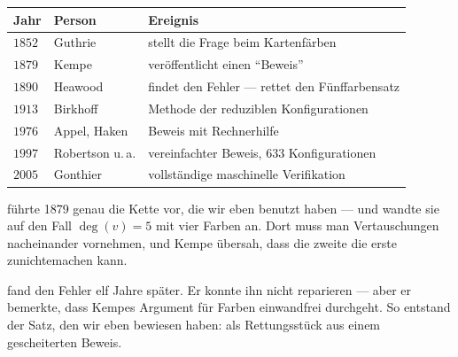 \begin{geschichte}
\begin{center}
{\small
\renewcommand{\arraystretch}{1.42}
\begin{tabular}{@{}P{1.6cm}P{2.2cm}P{4.0cm}@{}}
\toprule
\textbf{Jahr} & \textbf{Person} & \textbf{Ereignis}\\
\midrule
$1852$ & Guthrie & stellt die Frage beim Kartenfärben\\
$1879$ & Kempe & veröffentlicht einen \enquote{Beweis}\\
$1890$ & Heawood & findet den Fehler --- rettet den Fünffarbensatz\\
$1913$ & Birkhoff & Methode der reduziblen Konfigurationen\\
$1976$ & Appel, Haken & Beweis mit Rechnerhilfe\\
$1997$ & Robertson u.\,a. & vereinfachter Beweis, $633$ Konfigurationen\\
$2005$ & Gonthier & vollständige maschinelle Verifikation\\
\bottomrule
\end{tabular}}
\end{center}

 führte 1879 genau die Kette vor, die wir eben benutzt haben --- und wandte sie auf den Fall $\deg(v) = 5$ mit vier Farben an. Dort muss man  Vertauschungen nacheinander vornehmen, und Kempe übersah, dass die zweite die erste zunichtemachen kann.

 fand den Fehler elf Jahre später. Er konnte ihn nicht reparieren --- aber er bemerkte, dass Kempes Argument für  Farben einwandfrei durchgeht. So entstand der Satz, den wir eben bewiesen haben: als Rettungsstück aus einem gescheiterten Beweis.

\begin{center}
\begin{minipage}{0.9\textwidth}
\end{minipage}
\end{center}
\end{geschichte}


